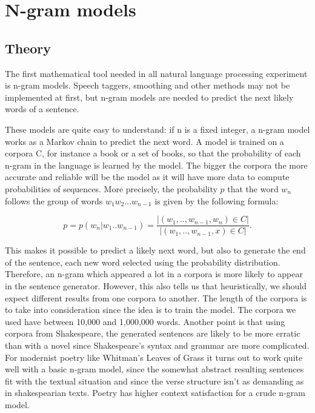 \documentclass[a4paper,12pt]{article}
\begin{document}
\section{N-gram models}
\label{sec:ngram}

\subsection{Theory}
The first mathematical tool needed in all natural language processing experiment is n-gram models. Speech taggers, smoothing and other methods may not be implemented at first, but n-gram models are needed to predict the next likely words of a sentence.

These models are quite easy to understand: if n is a fixed integer, a n-gram model works as a Markov chain to predict the next word. A model is trained on a corpora C, for instance a book or a set of books, so that the probability of each n-gram in the language is learned by the model. The bigger the corpora the more accurate and reliable will be the model as it will have more data to compute probabilities of sequences. More precisely, the probability $p$ that the word $w_n$ follows the group of words $w_1 w_2 ... w_{n-1}$ is given by the following formula:

$$ p = p(w_n | w_1 .. w_{n-1}) = \frac{|{(w_1, .., w_{n-1}, w_n) \in C}|}{|{(w_1, .., w_{n-1}, x) \in C}|} . $$

This makes it possible to predict a likely next word, but also to generate the end of the sentence, each new word selected using the probability distribution. Therefore, an n-gram which appeared a lot in a corpora is more likely to appear in the sentence generator. However, this also tells us that heuristically, we should expect different results from one corpora to another. The length of the corpora is to take into consideration since the idea is to train the model. The corpora we used have between 10,000 and 1,000,000 words. Another point is that using corpora from Shakespeare, the generated sentences are likely to be more erratic than with a novel since Shakespeare's syntax and grammar are more complicated. For modernist poetry like Whitman's Leaves of Grass it turns out to work quite well with a basic n-gram model, since the somewhat abstract resulting sentences fit with the textual situation and since the verse structure isn't as demanding as in shakespearian texts. Poetry has higher context satisfaction for a crude n-gram model.
\end{document}
